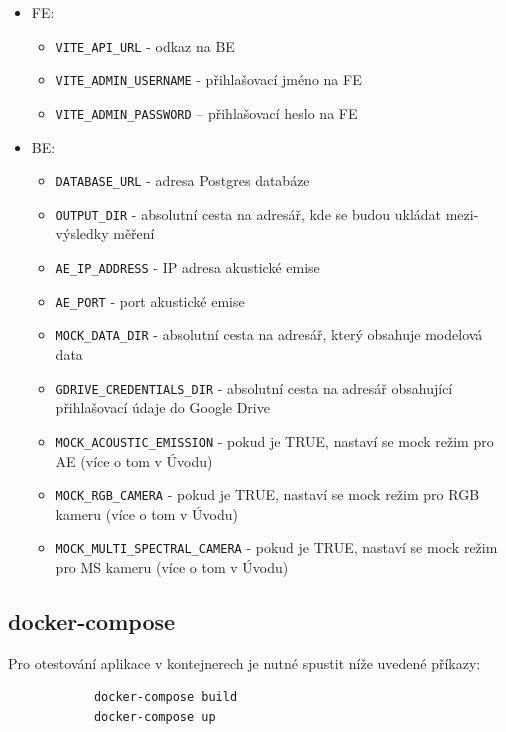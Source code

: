 \documentclass[12pt]{article}
\begin{document}
\begin{teamwork}
        \begin{itemize}
            \item FE:
            \begin{itemize}
                \item \texttt{VITE\_API\_URL} - odkaz na BE
                \item \texttt{VITE\_ADMIN\_USERNAME} - přihlašovací jméno na FE
                \item \texttt{VITE\_ADMIN\_PASSWORD} -- přihlašovací heslo na FE
            \end{itemize}
            \item BE:
            \begin{itemize}
                \item \texttt{DATABASE\_URL} - adresa Postgres databáze
                \item \texttt{OUTPUT\_DIR} - absolutní cesta na adresář, kde se budou ukládat mezi-výsledky měření
                \item \texttt{AE\_IP\_ADDRESS} - IP adresa akustické emise
                \item \texttt{AE\_PORT} - port akustické emise
                \item \texttt{MOCK\_DATA\_DIR} - absolutní cesta na adresář, který obsahuje modelová data
                \item \texttt{GDRIVE\_CREDENTIALS\_DIR} - absolutní cesta na adresář obsahující přihlašovací údaje do Google Drive
                \item \texttt{MOCK\_ACOUSTIC\_EMISSION} - pokud je TRUE, nastaví se mock režim pro AE (více o tom v Úvodu)
                \item \texttt{MOCK\_RGB\_CAMERA} - pokud je TRUE, nastaví se mock režim pro RGB kameru (více o tom v Úvodu)
                \item \texttt{MOCK\_MULTI\_SPECTRAL\_CAMERA} - pokud je TRUE, nastaví se mock režim pro MS kameru (více o tom v Úvodu)
            \end{itemize}
        \end{itemize}


        \subsection{docker-compose}\label{subsec:docker-compose}

        Pro otestování aplikace v kontejnerech je nutné spustit níže uvedené příkazy:

        \begin{verbatim}
            docker-compose build
            docker-compose up


\end{verbatim}
\end{teamwork}
\end{document}
